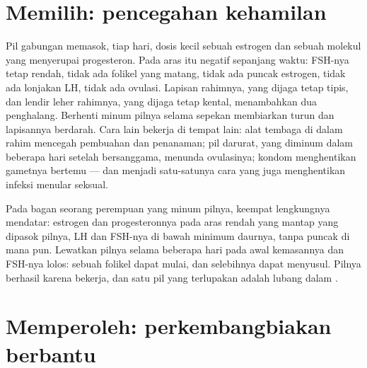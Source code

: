 \section{Memilih: pencegahan kehamilan}

\begin{proposition}\label{prop:g11:hormones-and-reproduction:contraception}
Pil gabungan memasok, tiap hari, dosis kecil sebuah estrogen dan sebuah
molekul yang menyerupai progesteron. Pada aras itu 
negatif sepanjang waktu: FSH-nya tetap rendah, tidak ada folikel yang
matang, tidak ada puncak estrogen, tidak ada lonjakan LH, tidak ada
ovulasi. Lapisan rahimnya, yang dijaga tetap tipis, dan lendir leher
rahimnya, yang dijaga tetap kental, menambahkan dua penghalang.
Berhenti minum pilnya selama sepekan membiarkan  turun dan
lapisannya berdarah. Cara lain bekerja di tempat lain: alat tembaga di
dalam rahim mencegah pembuahan dan penanaman; pil darurat, yang diminum
dalam beberapa hari setelah bersanggama, menunda ovulasinya; kondom
menghentikan gametnya bertemu --- dan menjadi satu-satunya cara yang
juga menghentikan infeksi menular seksual.
\end{proposition}
\admitted

\begin{example}\label{ex:g11:hormones-and-reproduction:pill}
Pada bagan seorang perempuan yang minum pilnya, keempat lengkungnya
mendatar: estrogen dan progesteronnya pada aras rendah yang mantap yang
dipasok pilnya, LH dan FSH-nya di bawah minimum daurnya, tanpa puncak
di mana pun. Lewatkan pilnya selama beberapa hari pada awal
kemasannya dan FSH-nya lolos: sebuah folikel dapat mulai, dan
selebihnya dapat menyusul. Pilnya berhasil karena 
bekerja, dan satu pil yang terlupakan adalah lubang dalam .
\end{example}

\section{Memperoleh: perkembangbiakan berbantu}

